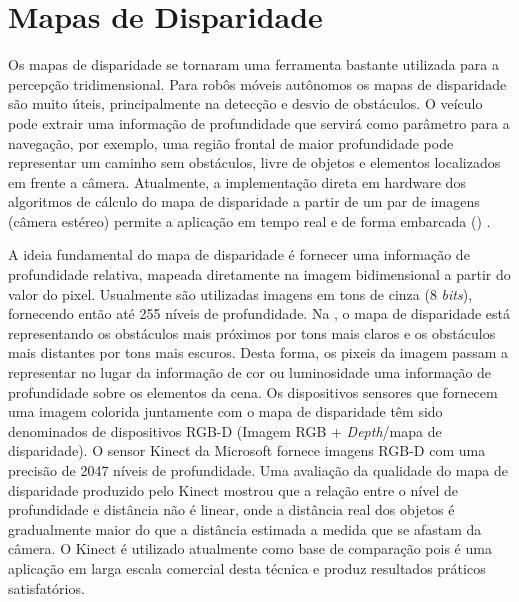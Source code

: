 \section{Mapas de Disparidade}
\label{sec:mapas_disparidade}

Os mapas de disparidade se tornaram uma ferramenta bastante utilizada para a
percepção tridimensional. Para robôs móveis autônomos os mapas de disparidade
são muito úteis, principalmente na detecção e desvio de obstáculos. O veículo
pode extrair uma informação de profundidade que servirá como parâmetro para a
navegação, por exemplo, uma região frontal de maior profundidade pode
representar um caminho sem obstáculos, livre de objetos e elementos localizados
em frente a câmera. Atualmente, a implementação direta em hardware dos
algoritmos de cálculo do mapa de disparidade a partir de um par de imagens
(câmera estéreo) permite a aplicação em tempo real e de forma embarcada
() \cite{Khaleghi2008}.

A ideia fundamental do mapa de disparidade é fornecer uma informação de
profundidade relativa, mapeada diretamente na imagem bidimensional a partir do
valor do pixel. Usualmente são utilizadas imagens em tons de cinza (8
\textit{bits}), fornecendo então até 255 níveis de profundidade. Na
, o mapa de disparidade está representando os obstáculos mais
próximos por tons mais claros e os obstáculos mais distantes por tons mais
escuros. Desta forma, os pixeis da imagem passam a representar no lugar da
informação de cor ou luminosidade uma informação de profundidade sobre os
elementos da cena. Os dispositivos sensores que fornecem uma imagem colorida
juntamente com o mapa de disparidade têm sido denominados de dispositivos RGB-D
(Imagem RGB + \textit{Depth}/mapa de disparidade). O sensor Kinect da
Microsoft fornece
imagens RGB-D com uma precisão de 2047 níveis de profundidade. Uma avaliação da
qualidade do mapa de disparidade produzido pelo Kinect \cite{Khoshelham2012}
mostrou que a relação entre o nível de profundidade e distância não é linear,
onde a distância real dos objetos é gradualmente maior do que a distância
estimada a medida que se afastam da câmera. O Kinect é utilizado atualmente como
base de comparação pois é uma aplicação em larga escala comercial desta técnica
e produz resultados práticos satisfatórios.

